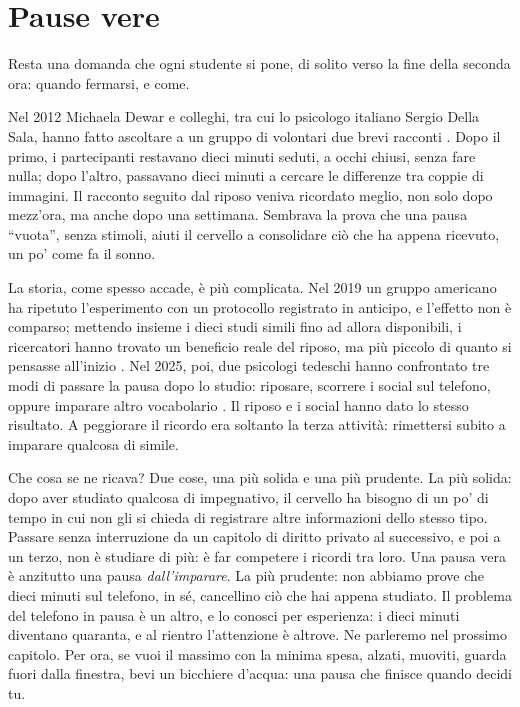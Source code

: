 \section{Pause vere}

Resta una domanda che ogni studente si pone, di solito verso la fine
della seconda ora: quando fermarsi, e come.

Nel 2012 Michaela Dewar e colleghi, tra cui lo psicologo italiano
Sergio Della Sala, hanno fatto ascoltare a un gruppo di volontari due
brevi racconti \parencite{dewar2012}. Dopo il primo, i partecipanti
restavano dieci minuti seduti, a occhi
chiusi, senza fare nulla; dopo l'altro, passavano dieci minuti a
cercare le differenze tra coppie di immagini. Il racconto seguito dal
riposo veniva ricordato meglio, non solo dopo mezz'ora, ma anche dopo
una settimana. Sembrava la prova che una pausa \enquote{vuota}, senza
stimoli, aiuti il cervello a consolidare ciò che ha appena ricevuto, un
po' come fa il sonno.

La storia, come spesso accade, è più complicata. Nel 2019 un gruppo
americano ha ripetuto l'esperimento con un protocollo registrato in
anticipo, e l'effetto non è comparso; mettendo insieme i dieci studi
simili fino ad allora disponibili, i ricercatori hanno trovato un
beneficio reale del riposo, ma più piccolo di quanto si pensasse
all'inizio \parencite{humiston2019}. Nel 2025, poi, due psicologi
tedeschi hanno confrontato tre modi di passare la pausa dopo lo studio:
riposare, scorrere i social sul telefono, oppure imparare altro
vocabolario \parencite{quevedoputter2025}. Il riposo e i social hanno
dato lo stesso risultato. A peggiorare il ricordo era soltanto la terza
attività: rimettersi subito a imparare qualcosa di simile.

Che cosa se ne ricava? Due cose, una più solida e una più prudente. La
più solida: dopo aver studiato qualcosa di impegnativo, il cervello ha
bisogno di un po' di tempo in cui non gli si chieda di registrare altre
informazioni dello stesso tipo. Passare senza interruzione da un
capitolo di diritto privato al successivo, e poi a un terzo, non è
studiare di più: è far competere i ricordi tra loro. Una pausa vera è
anzitutto una pausa \emph{dall'imparare}. La più prudente: non abbiamo
prove che dieci minuti sul telefono, in sé, cancellino ciò che hai
appena studiato. Il problema del telefono in pausa è un altro, e lo
conosci per esperienza: i dieci minuti diventano quaranta, e al rientro
l'attenzione è altrove. Ne parleremo nel prossimo capitolo. Per ora,
se vuoi il massimo con la minima spesa, alzati, muoviti, guarda fuori
dalla finestra, bevi un bicchiere d'acqua: una pausa che finisce quando
decidi tu.


